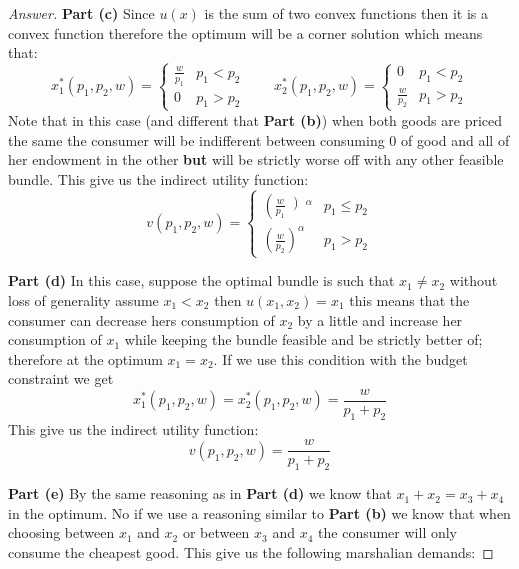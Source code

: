 \documentclass{article}
\theoremstyle{definition}
\begin{document}
\begin{proof}[Answer]
\textbf{Part (c)}
Since $u(x)$ is the sum of two convex functions then it is a convex function therefore
the optimum will be a corner solution which means that:
$$x_1^*(p_1,p_2,w) = \left \{ \begin{array}{cc}
     \frac{w}{p_1}&  p_1 < p_2\\
     0 & p_1 > p_2
\end{array} \qquad x_2^*(p_1,p_2,w) = \left \{ \begin{array}{cc}
     0&  p_1 < p_2\\
    \frac{w}{p_2} & p_1 > p_2
\end{array}$$ 
Note that in this case (and different that \textbf{Part (b)}) when both goods are priced the same the consumer will be indifferent between consuming 0 of good and all of her endowment in the other \textbf{but} will be strictly worse off with any other feasible bundle. This give us the indirect utility function:
$$v(p_1,p_2,w) = \left \{ \begin{array}{cc}
     \left(\frac{w}{p_1}\left)^\alpha&  p_1 \leq p_2\\
     \left(\frac{w}{p_2}\right)^\alpha & p_1 > p_2
\end{array}$$

\textbf{Part (d)} In this case, suppose the optimal bundle is such that $x_1\neq x_2$ without loss of generality assume $x_1<x_2$ then $u(x_1,x_2)=x_1$ this means that the consumer can decrease hers consumption of $x_2$ by a little and increase her consumption of $x_1$ while keeping the bundle feasible and be strictly better of; therefore at the optimum $x_1=x_2$. If we use this condition with the budget constraint we get
$$x_1^*(p_1,p_2,w) = x_2^*(p_1,p_2,w) = \frac{w}{p_1+p_2}$$
This give us the indirect utility function:
$$v(p_1,p_2,w) = \frac{w}{p_1+p_2}$$

\textbf{Part (e)}
By the same reasoning as in \textbf{Part (d)} we know that $x_1+x_2 = x_3+x_4$ in the optimum. No if we use a reasoning similar to \textbf{Part (b)} we know that when choosing between $x_1$ and $x_2$ or between $x_3$ and $x_4$ the consumer will only consume the cheapest good. This give us the following marshalian demands:


\end{proof}
\end{document}
